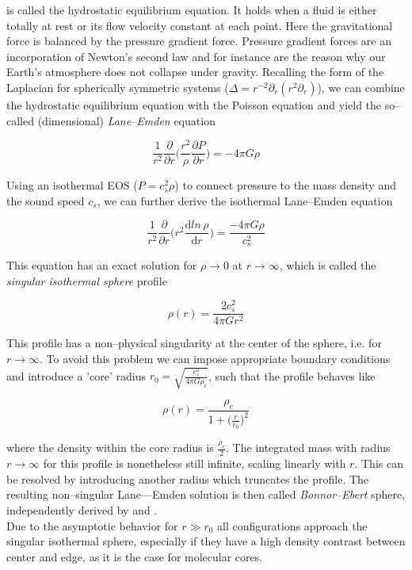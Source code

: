  is called the hydrostatic equilibrium equation.
It holds when a fluid is either totally at rest or its flow velocity constant at each point.
Here the gravitational force is balanced by the pressure gradient force.
Pressure gradient forces are an incorporation of Newton's second law and for instance are the reason why our Earth's atmosphere does not collapse under gravity.
Recalling the form of the Laplacian for spherically symmetric systems ($\Delta = r^{-2} \partial_{r}(r^{2}\partial_{r})$), we can combine the hydrostatic equilibrium equation with the Poisson equation and yield the so--called (dimensional) \textit{Lane--Emden} equation

\begin{equation}
  \frac{1}{r^{2}} \frac{\partial}{\partial r} \big( \frac{r^{2}}{\rho} \frac{\partial P}{\partial r} \big) = -4\pi G\rho
\end{equation}

Using an isothermal EOS ($P=c_{s}^{2}\rho$) to connect pressure to the mass density and the sound speed $c_{s}$, we can further derive the isothermal Lane--Emden equation

\begin{equation}
  \frac{1}{r^{2}} \frac{\partial}{\partial r} \big(r^{2} \frac{\mathrm{d}ln\,\rho}{\mathrm{d}r} \big) = \frac{-4\pi G\rho}{c_{s}^{2}}
\end{equation}

This equation has an exact solution for $\rho \to 0$ at $r \to \infty$, which is called the \textit{singular isothermal sphere} profile

\begin{equation}
  \rho(r) = \frac{2c_{s}^{2}}{4\pi Gr^{2}}
\label{eq:SIS}
\end{equation}

This profile has a non--physical singularity at the center of the sphere, i.e. for $r \to \infty$.
To avoid this problem we can impose appropriate boundary conditions and introduce a 'core' radius $r_{0} = \sqrt{\frac{c_{s}^2}{4\pi G\rho_{c}}}$, such that the profile behaves like

\begin{equation}
  \rho(r) = \frac{\rho_{c}}{1+\big(\frac{r}{r_{0}}\big)^{2}}
\end{equation}

where the density within the core radius is $\frac{\rho_{c}}{2}$.
The integrated mass with radius $r \to \infty$ for this profile is nonetheless still infinite, scaling linearly with $r$.
This can be resolved by introducing another radius which truncates the profile.
The resulting non--singular Lane---Emden solution is then called \textit{Bonnor--Ebert} sphere, independently derived by \citet{Bonnor} and \citet{Ebert}.
\\[6pt]
%
Due to the asymptotic behavior for $r \gg r_{0}$ all configurations approach the singular isothermal sphere, especially if they have a high density contrast between center and edge, as it is the case for molecular cores.


